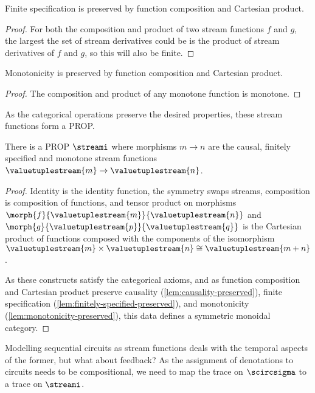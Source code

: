 \begin{lemma}\label{lem:finitely-specified-preserved}
    Finite specification is preserved by function composition and Cartesian
    product.
\end{lemma}
\begin{proof}
    For both the composition and product of two stream functions \(f\) and
    \(g\), the largest the set of stream derivatives could be is the product of
    stream derivatives of \(f\) and \(g\), so this will also be finite.
\end{proof}

\begin{lemma}\label{lem:monotonicity-preserved}
    Monotonicity is preserved by function composition and Cartesian product.
\end{lemma}
\begin{proof}
    The composition and product of any monotone function is monotone.
\end{proof}

As the categorical operations preserve the desired properties, these stream
functions form a PROP.

\begin{proposition}
    There is a PROP \(\streami\) where morphisms \(m \to n\) are the causal,
    finitely specified and monotone stream functions \(
    \valuetuplestream{m} \to \valuetuplestream{n}
    \).
\end{proposition}
\begin{proof}
    Identity is the identity function, the symmetry swaps streams, composition
    is composition of functions, and tensor product on morphisms
    \(\morph{f}{\valuetuplestream{m}}{\valuetuplestream{n}}\) and
    \(\morph{g}{\valuetuplestream{p}}{\valuetuplestream{q}}\) is the Cartesian
    product of functions composed with the components of the isomorphism
    \(\valuetuplestream{m} \times \valuetuplestream{n}
    \cong \valuetuplestream{m+n}\).

    As these constructs satisfy the categorical axioms, and as function
    composition and Cartesian product preserve causality
    (\cref{lem:causality-preserved}),
    finite specification (\cref{lem:finitely-specified-preserved}),
    and monotonicity (\cref{lem:monotonicity-preserved}), this data defines a
    symmetric monoidal category.
\end{proof}

Modelling sequential circuits as stream functions deals with the temporal
aspects of the former, but what about feedback?
As the assignment of denotations to circuits needs to be compositional, we need
to map the trace on \(\scircsigma\) to a trace on \(\streami\).

